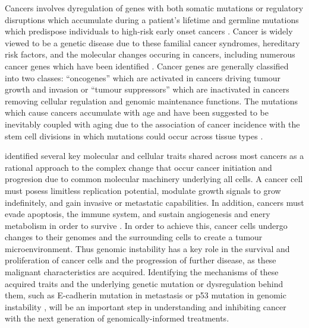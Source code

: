 Cancers involves dyregulation of genes with both somatic mutations or regulatory disruptions which accumulate during a patient's lifetime and germline mutations which predispose individuals to high-risk early onset cancers \citep{NCI2015, ACS2017, Guilford1998}. Cancer is widely viewed to be a genetic disease due to these familial cancer syndromes, hereditary risk factors, and the molecular changes occuring in cancers, including numerous cancer genes which have been identified \citet{Stratton2009, Vogelstein2013}. Cancer genes are generally classified into two classes: ``oncogenes'' which are activated in cancers driving tumour growth and invasion or ``tumour suppressors'' which are inactivated in cancers removing cellular regulation and genomic maintenance functions. The mutations which cause cancers accumulate with age and have been suggested to be inevitably coupled with aging due to the association of cancer incidence with the stem cell divisions in which mutations could occur across tissue types \citep{Tomasetti2015}.  


\citet{Hanahan2000} identified several key molecular and cellular traits shared across most cancers as a rational approach to the complex change that occur cancer initiation and progresion due to common molecular machinery underlying all cells. A cancer cell must posess limitless replication potential, modulate growth signals to grow indefinitely, and gain invasive or metastatic capabilities. In addition, cancers must evade apoptosis, the immune system, and sustain angiogenesis and enery metabolism in order to survive \citep{Hanahan2011, Hanahan2000}. In order to achieve this, cancer cells undergo changes to their genomes and the surrounding cells to create a tumour microenvironment. Thus genomic instability has a key role in the survival and proliferation of cancer cells and the progression of further disease, as these malignant characteristics are acquired. Identifying the mechanisms of these acquired traits and the underlying genetic mutation or dysregulation behind them, such as E-cadherin mutation in metastasis or p53 mutation in genomic instability \citep{Hanahan2000}, will be an important step in understanding and inhibiting cancer with the next generation of genomically-informed treatments. 

